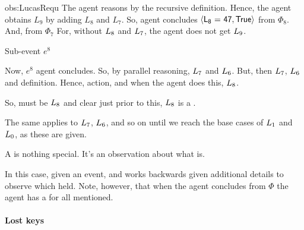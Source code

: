 \begin{note}
\begin{motivation}{obs:LucasRequ}
    The agent reasons by the recursive definition.
    Hence, the agent obtains \(L_{9}\) by adding \(L_{8}\) and \(L_{7}\).
    So, agent concludes \(\pv{\propI{L\textsubscript{8} = 47}}{\valI{True}}\) from \(\Phi_{8}\).
    And,  from \(\Phi_{7}\)
    For, without \(L\textsubscript{8}\) and \(L\textsubscript{7}\), the agent does not get \(L\textsubscript{9}\).

    Sub-event \(e^{8}\)

    Now, \(e^{8}\) agent concludes.
    So, by parallel reasoning, \(L\textsubscript{7}\) and \(L\textsubscript{6}\).
    But, then \(L\textsubscript{7}\), \(L\textsubscript{6}\) and definition.
    Hence, action, and when the agent does this, \(L\textsubscript{8}\).

    So, must be \(L\textsubscript{8}\) and clear just prior to this, \(L\textsubscript{8}\) is a \fc{}.
  \end{motivation}

  The same applies to \(L\textsubscript{7}\), \(L\textsubscript{6}\), and so on until we reach the base cases of \(L\textsubscript{1}\) and \(L\textsubscript{0}\), as these are given.
\end{note}

\begin{note}
  A \requ{} is nothing special.
  It's an observation about what is.

  In this case, given an event, and works backwards given additional details to observe which  held.
  Note, however, that when the agent concludes  from \(\Phi\) the agent has a \wit{} for all \ros{} mentioned.
\end{note}

\paragraph*{Lost keys}

